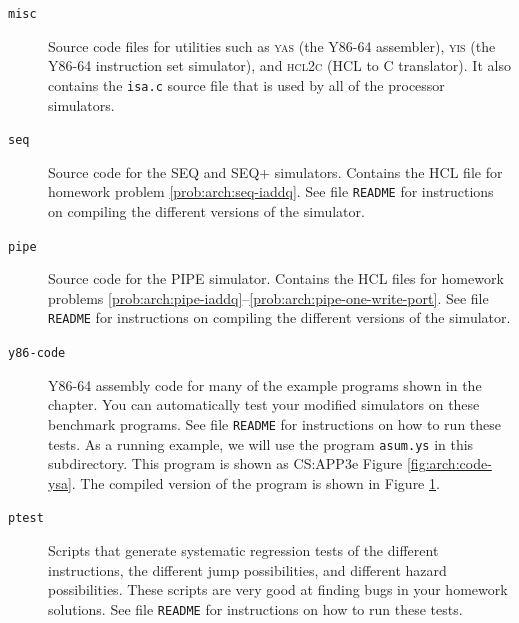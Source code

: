 \documentclass[11pt]{article}
\begin{document}
\begin{description}
\item[\texttt{misc}]

Source code files for utilities such as \textsc{yas} (the Y86-64
assembler), \textsc{yis} (the Y86-64 instruction set simulator), and
\textsc{hcl2c} (HCL to C translator).  
It also contains the {\tt isa.c} source file that is  used by all of the 
processor simulators.

\item[\texttt{seq}]

Source code for the SEQ and SEQ+ simulators.  Contains the HCL file
for homework problem \ref{prob:arch:seq-iaddq}.
See file \texttt{README} for instructions 
on compiling the different versions of the simulator.

\item[\texttt{pipe}]

Source code for the PIPE simulator.
Contains the HCL files for homework problems
\ref{prob:arch:pipe-iaddq}--\ref{prob:arch:pipe-one-write-port}.  See
file \texttt{README} for instructions on compiling the different
versions of the simulator.

\item[\texttt{y86-code}]

Y86-64 assembly code for many of the example programs shown in the
chapter.  You can automatically test your modified simulators on these
benchmark programs.  See file \texttt{README} for instructions on how
to run these tests.  As a running example, we will use the program
\texttt{asum.ys} in this subdirectory.  This program is shown as
CS:APP3e Figure \ref{fig:arch:code-ysa}.  The compiled version of the
program is shown in Figure \ref{fig:sim:code-yssim}.

\item[\texttt{ptest}]
Scripts that generate systematic regression tests of the different
instructions, the different jump possibilities, and different hazard
possibilities.  These scripts are very good at finding bugs in your
homework solutions.
See file \texttt{README} for instructions on how to run these tests.
\end{description}

\begin{figure}
\begin{ccode}

\end{ccode}
\label{fig:sim:code-yssim}
\end{figure}
\end{document}
